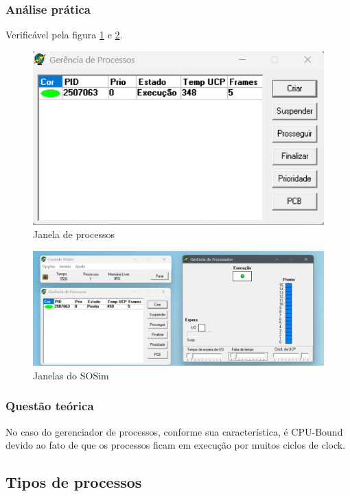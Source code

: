 \documentclass[a4paper,12pt]{article} %
\begin{document}
\subsubsection[]{Análise prática}
Verificável pela figura \ref{fig2} e \ref{fig3}.
\begin{figure}[htbp]
    \centering
    \includegraphics[scale=0.8]{../fig/fig2.png}
    \caption{Janela de processos}
    \label{fig2}
\end{figure}

\begin{figure}[htbp]
    \centering
    \includegraphics[scale=0.4]{../fig/fig3.png}
    \caption{Janelas do SOSim}
    \label{fig3}
\end{figure}

\subsubsection[]{Questão teórica}
No caso do gerenciador de processos, conforme sua característica, é CPU-Bound devido ao fato de que os processos ficam
em execução por muitos ciclos de clock.
\subsection[]{Tipos de processos}
\end{document}
